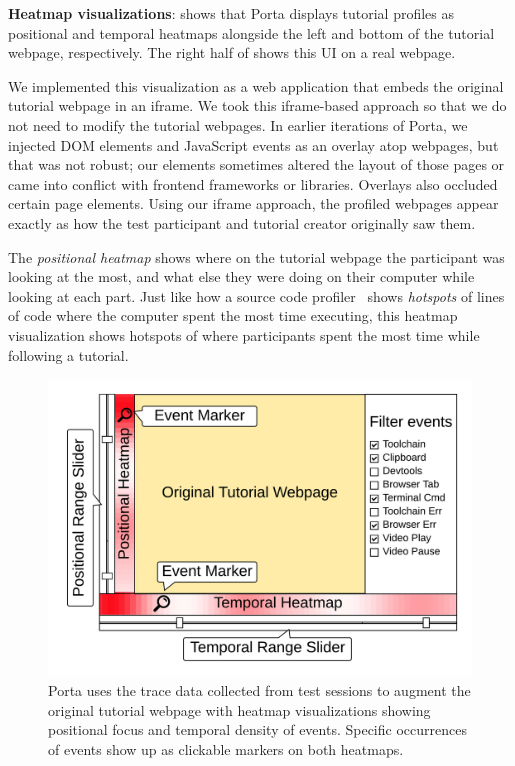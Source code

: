 \textbf{Heatmap visualizations}:
%
 shows that Porta displays tutorial profiles
as positional and temporal heatmaps alongside the left and bottom of the
tutorial webpage, respectively.
%
The right half of  shows this UI on a real webpage.

We implemented this visualization as a web application that embeds the
original tutorial webpage in an iframe. We took this iframe-based
approach so that we do not need to modify the tutorial webpages. In
earlier iterations of Porta, we injected DOM elements and JavaScript
events as an overlay atop webpages, but that was not robust; our
elements sometimes altered the layout of those pages or came into
conflict with frontend frameworks or libraries. Overlays also occluded
certain page elements. Using our iframe approach, the profiled webpages
appear exactly as how the test participant and tutorial creator
originally saw them.

The \emph{positional heatmap} shows where on the tutorial
webpage the participant was looking at the most, and what else they were
doing on their computer while looking at each part. Just like how a
source code profiler~\cite{Graham1982,Srivastava1994} shows \emph{hotspots} of lines of
code where the computer spent the most time executing, this heatmap
visualization shows hotspots of where participants spent the most time
while following a tutorial.


\begin{figure}[h!]
  \centering
  \includegraphics[width=0.9\columnwidth]{figures/porta/porta-viewer-sketch}

\vspace{-0.75em}

  \caption{Porta uses the trace data collected from test sessions to
  augment the original tutorial webpage with heatmap visualizations
  showing positional focus and temporal density of events. Specific
  occurrences of events show up as clickable markers on both heatmaps.}

\vspace{-0.75em}

  \label{fig:porta-components}
\end{figure}

